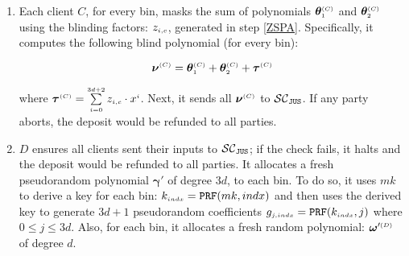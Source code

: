\begin{enumerate}
\item\label{blindPoly-C-sends-to-contract} Each client $ C$, for every bin, masks the sum of polynomials $\bm\theta^{\scriptscriptstyle  {  {(C)}}}_{\scriptscriptstyle 1}$ and $\bm\theta^{\scriptscriptstyle  {  {(C)}}}_{\scriptscriptstyle 2}$  using the blinding factors: $z_{\scriptscriptstyle i,c}$, generated in step \ref{ZSPA}. Specifically, it computes the following blind polynomial (for every bin):  

$$\bm\nu^{ \scriptscriptstyle {  {(C)}} }= \bm\theta^{ \scriptscriptstyle {  {(C)}}}_{\scriptscriptstyle 1}+\bm\theta^{\scriptscriptstyle  {  {(C)}}}_{\scriptscriptstyle 2}+\bm \tau^{\scriptscriptstyle  {  {(C)}} }$$

where $\bm\tau^{\scriptscriptstyle  {  {(C)}}}=\sum\limits^{\scriptscriptstyle 3d+2}_{\scriptscriptstyle i=0}z_{\scriptscriptstyle i,c}\cdot x^{\scriptscriptstyle i}$. Next, it sends  all $\bm\nu^{\scriptscriptstyle  {  {(C)}} }$ to $\mathcal{SC}_{\mathtt{JUS}}$. If any party aborts, the deposit would be refunded to all parties.










\item\label{f-psi::D-gen-random-poly} ${D}$ ensures all clients sent their inputs to $\mathcal{SC}_{\mathtt{JUS}}$; if the check fails, it halts and the deposit would be refunded to all parties. It allocates a fresh pseudorandom polynomial $\bm\gamma'$ of degree $3d$, to each bin. To do so, it uses $mk$ to derive a key for each bin: $k_{\scriptscriptstyle  { {indx}}}=\mathtt{PRF}(mk, {    {   {indx}}})$ and then uses the derived key to generate $3d+1$ pseudorandom coefficients $g_{\scriptscriptstyle  { {j,indx}}}=\mathtt{PRF}(k_{\scriptscriptstyle  { {indx}}}, j)$ where $ 0\leq j \leq 3d$. Also, for each bin,  it allocates a fresh random polynomial:  $\bm\omega'^{\scriptscriptstyle  {  {(D)}}}$ of degree $d$. 


\end{enumerate}
